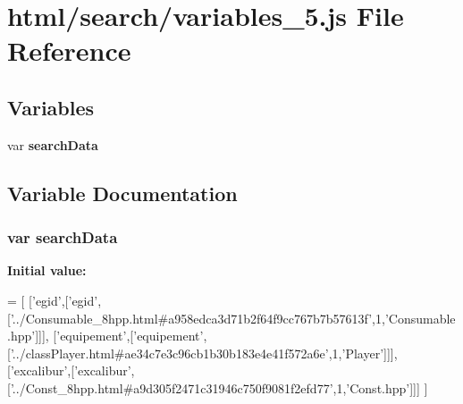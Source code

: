 \section{html/search/variables\-\_\-5.js File Reference}
\label{variables__5_8js}
\subsection*{Variables}
\begin{DoxyCompactItemize}
\item 
var {\bf search\-Data}
\end{DoxyCompactItemize}


\subsection{Variable Documentation}
\subsubsection[{search\-Data}]{\setlength{\rightskip}{0pt plus 5cm}var search\-Data}\label{variables__5_8js_ad01a7523f103d6242ef9b0451861231e}
{\bfseries Initial value\-:}
\begin{DoxyCode}
=
[
  [\textcolor{stringliteral}{'egid'},[\textcolor{stringliteral}{'egid'},[\textcolor{stringliteral}{'../Consumable\_8hpp.html#a958edca3d71b2f64f9cc767b7b57613f'},1,\textcolor{stringliteral}{'Consumable.hpp'}]]],
  [\textcolor{stringliteral}{'equipement'},[\textcolor{stringliteral}{'equipement'},[\textcolor{stringliteral}{'../classPlayer.html#ae34c7e3c96cb1b30b183e4e41f572a6e'},1,\textcolor{stringliteral}{'Player'}]]],
  [\textcolor{stringliteral}{'excalibur'},[\textcolor{stringliteral}{'excalibur'},[\textcolor{stringliteral}{'../Const\_8hpp.html#a9d305f2471c31946c750f9081f2efd77'},1,\textcolor{stringliteral}{'Const.hpp'}]]]
]
\end{DoxyCode}
